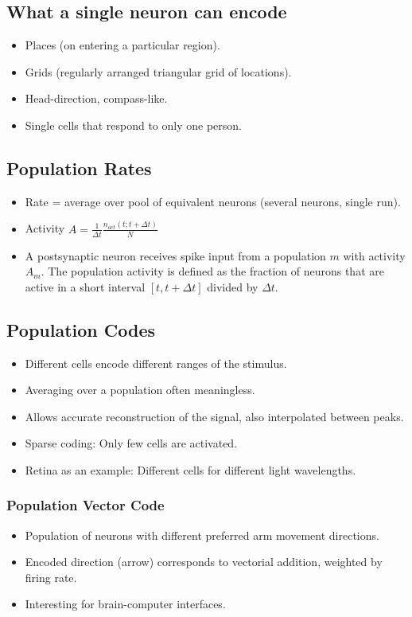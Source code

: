 \documentclass[a4paper, 12pt]{article}
\begin{document}
\subsection{What a single neuron can encode}
\begin{itemize}[noitemsep,nolistsep]
	\item Places (on entering a particular region).
	\item Grids (regularly arranged triangular grid of locations).
	\item Head-direction, compass-like.
	\item Single cells that respond to only one person.
\end{itemize}

\subsection{Population Rates}
\begin{itemize}[noitemsep,nolistsep]
	\item Rate = average over pool of equivalent neurons (several neurons, single run).
	\item Activity $A=\frac{1}{\Delta t}\frac{n_{act}(t;t+\Delta t)}{N}$
	\item A postsynaptic neuron receives spike input from a population $m$ with activity $A_m$. The population activity is defined as the fraction of neurons that are active in a short interval $[t,t+\Delta t]$ divided by $\Delta t$.
\end{itemize}

\subsection{Population Codes}
\begin{itemize}[noitemsep,nolistsep]
	\item Different cells encode different ranges of the stimulus.
	\item Averaging over a population often meaningless.
	\item Allows accurate reconstruction of the signal, also interpolated between peaks.
	\item Sparse coding: Only few cells are activated.
	\item Retina as an example: Different cells for different light wavelengths.
\end{itemize}

\subsubsection{Population Vector Code}
\begin{itemize}[noitemsep,nolistsep]
	\item Population of neurons with different preferred arm movement directions.
	\item Encoded direction (arrow) corresponds to vectorial addition, weighted by firing rate.
	\item Interesting for brain-computer interfaces.
\end{itemize}
\end{document}
